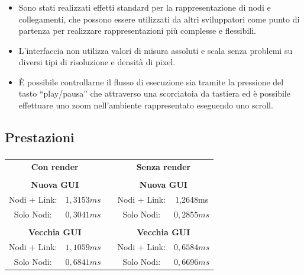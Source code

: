 \begin{frame}
    \frametitle{\insertsection}
    \framesubtitle{\insertsubsection}
    \begin{itemize}[<+(1)->]
        \item
            Sono stati realizzati effetti standard per la rappresentazione di nodi e collegamenti, che possono essere utilizzati da altri sviluppatori come punto di partenza per realizzare rappresentazioni più complesse e flessibili.

        \item
            L'interfaccia non utilizza valori di misura assoluti e scala senza problemi su diversi tipi di risoluzione e densità di pixel.

        \item
            È possibile controllarne il flusso di esecuzione sia tramite la pressione del tasto ``play/pausa'' che attraverso una scorciatoia da tastiera ed è possibile effettuare uno zoom nell'ambiente rappresentato eseguendo uno scroll.
    \end{itemize}
\end{frame}

\subsection{Prestazioni}\label{subsec:benchmark}
\begin{frame}
    \frametitle{\insertsection}
    \framesubtitle{\insertsubsection}
    \centering
    \begin{tabular}{ccccc}
        \multicolumn{2}{c}{\textbf{Con render}} &  & \multicolumn{2}{c}{\textbf{Senza render}} \\
         &  &  &  &  \\ \cline{1-2} \cline{4-5}
        \multicolumn{2}{|c|}{\textbf{Nuova GUI}} & \multicolumn{1}{c|}{} & \multicolumn{2}{c|}{\textbf{Nuova GUI}} \\ \cline{1-2} \cline{4-5}
        \multicolumn{1}{|c|}{Nodi + Link:} & \multicolumn{1}{c|}{$1,3153ms$} & \multicolumn{1}{c|}{} & \multicolumn{1}{c|}{Nodi + Link:} & \multicolumn{1}{c|}{1,2648ms} \\ \cline{1-2} \cline{4-5}
        \multicolumn{1}{|c|}{Solo Nodi:} & \multicolumn{1}{c|}{$0,3041ms$} & \multicolumn{1}{c|}{} & \multicolumn{1}{c|}{Solo Nodi:} & \multicolumn{1}{c|}{$0,2855ms$} \\ \cline{1-2} \cline{4-5}
         &  &  &  &  \\ \cline{1-2} \cline{4-5}
        \multicolumn{2}{|c|}{\textbf{Vecchia GUI}} & \multicolumn{1}{c|}{} & \multicolumn{2}{c|}{\textbf{Vecchia GUI}} \\ \cline{1-2} \cline{4-5}
        \multicolumn{1}{|c|}{Nodi + Link:} & \multicolumn{1}{c|}{$1,1059ms$} & \multicolumn{1}{c|}{} & \multicolumn{1}{c|}{Nodi + Link:} & \multicolumn{1}{c|}{$0,6584ms$} \\ \cline{1-2} \cline{4-5}
        \multicolumn{1}{|c|}{Solo Nodi:} & \multicolumn{1}{c|}{$0,6841ms$} & \multicolumn{1}{c|}{} & \multicolumn{1}{c|}{Solo Nodi:} & \multicolumn{1}{c|}{$0,6696ms$} \\ \cline{1-2} \cline{4-5}
    \end{tabular}
\end{frame}
